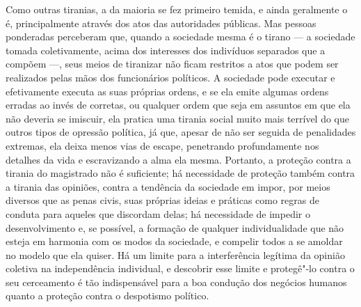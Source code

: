 Como outras tiranias, a da maioria se fez primeiro temida, e ainda
geralmente o é, principalmente através dos atos das autoridades
públicas. Mas pessoas ponderadas perceberam que, quando a sociedade
mesma é o tirano --- a sociedade tomada coletivamente, acima dos
interesses dos indivíduos separados que a compõem ---, seus meios de
tiranizar não ficam restritos a atos que podem ser realizados pelas
mãos dos funcionários políticos. A sociedade pode executar e efetivamente 
executa as suas próprias ordens, e se ela emite algumas ordens erradas ao invés
de corretas, ou qualquer ordem que seja em assuntos em que ela não
deveria se imiscuir, ela pratica uma tirania social muito mais
terrível do que outros tipos de opressão política, já que, apesar de
não ser seguida de penalidades extremas, ela deixa menos vias de
escape, penetrando profundamente nos detalhes da vida e escravizando a 
alma ela mesma. Portanto, a proteção contra a tirania do magistrado não é
suficiente; há necessidade de proteção também contra a tirania das opiniões,
contra a tendência da sociedade em impor, por meios diversos que as penas
civis, suas próprias ideias e práticas como regras de conduta para
aqueles que discordam delas; há necessidade de impedir o desenvolvimento e, se
possível, a formação de qualquer individualidade que não esteja em
harmonia com os modos da sociedade, e compelir todos a se amoldar no 
modelo que ela quiser. Há um limite para a interferência
legítima da opinião coletiva na independência individual, e descobrir
esse limite e protegê"-lo contra o seu cerceamento é tão
indispensável para a boa condução dos negócios humanos quanto a
proteção contra o despotismo político. 

